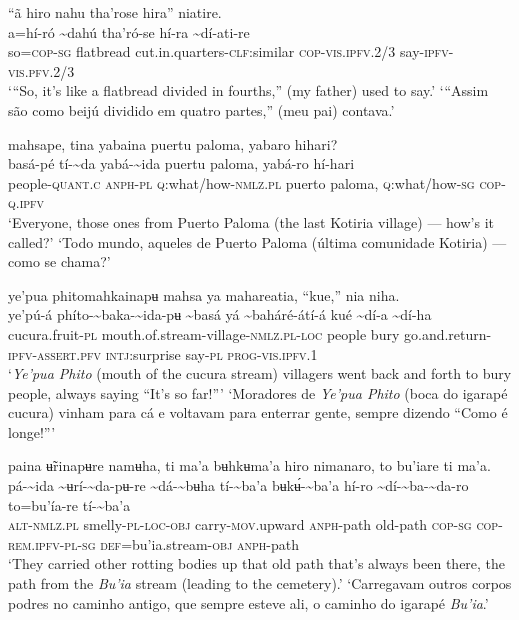\documentclass[output=paper,
modfonts,nonflat
]{langsci/langscibook}
\begin{document}
\ea “ã hiro nahu tha'rose hira” niatire. \\[.3em]
\gll {\textasciitilde}a=hí-ró	{\textasciitilde}dahú	tha'ró-se	hí-ra	{\textasciitilde}dí-ati-re \\
     so=\textsc{cop-sg}	flatbread	cut.in.quarters-\textsc{clf:}similar	\textsc{cop-vis.ipfv.}2/3	say-\textsc{ipfv-vis.pfv.}2/3\\
\glt ‘“So, it's like a flatbread divided in fourths,” (my father) used to say.’
\glt ‘“Assim são como beijú dividido em quatro partes,” (meu pai) contava.’
\z 

\ea mahsape, tina yabaina puertu paloma, yabaro hihari? \\[.3em]
\gll {\textasciitilde}basá-pé	tí-{\textasciitilde}da	yabá-{\textasciitilde}ida	puertu paloma,	yabá-ro	hí-hari \\
     people-\textsc{quant.c}	\textsc{anph-pl}	\textsc{q:}what/how\textsc{-nmlz.pl}	puerto paloma,	\textsc{q:}what/how\textsc{-sg}	\textsc{cop-q.ipfv}\\
\glt ‘Everyone, those ones from Puerto Paloma (the last Kotiria village) — how’s it called?’
\glt ‘Todo mundo, aqueles de Puerto Paloma (última comunidade Kotiria) — como se chama?’
\z 


\ea ye'pua phitomahkainapʉ mahsa ya mahareatia, “kue,” nia niha. \\[.3em]
\gll ye'pú-á	phíto-{\textasciitilde}baka-{\textasciitilde}ida-pʉ	{\textasciitilde}basá	yá	{\textasciitilde}baháré-átí-á kué	{\textasciitilde}dí-a	{\textasciitilde}dí-ha\\
     cucura.fruit\textsc{-pl}	mouth.of.stream-village\textsc{-nmlz.pl-loc}	people	bury	go.and.return-\textsc{ipfv-assert.pfv} \textsc{intj}:surprise	say\textsc{-pl}	\textsc{prog-vis.ipfv.}1\\
\newpage 
\glt ‘\textit{Ye'pua Phito} (mouth of the cucura stream) villagers went back and forth to bury people, always saying “It's so far!”’
\glt ‘Moradores de \textit{Ye'pua Phito} (boca do igarapé cucura) vinham para cá e voltavam para enterrar gente, sempre dizendo “Como é longe!”’
\z

\ea paina ʉ̃rinapʉre namʉha, ti ma'a bʉhkʉma'a hiro nimanaro, to bu'iare ti ma'a. \\[.3em]
\gll pá-{\textasciitilde}ida	{\textasciitilde}ʉrí-{\textasciitilde}da-pʉ-re	{\textasciitilde}dá-{\textasciitilde}bʉha	tí-{\textasciitilde}ba'a	bʉkʉ́-{\textasciitilde}ba'a	hí-ro {\textasciitilde}dí-{\textasciitilde}ba-{\textasciitilde}da-ro	to=bu'ía-re	tí-{\textasciitilde}ba'a \\
     \textsc{alt-nmlz.pl}	smelly\textsc{-pl-loc-obj}	carry-\textsc{mov.}upward	\textsc{anph}-path	old-path	\textsc{cop-sg} \textsc{cop-rem.ipfv-pl-sg}	\textsc{def}=bu'ia.stream\textsc{-obj}	\textsc{anph}-path\\
\glt ‘They carried other rotting bodies up that old path that's always been there, the path from the \textit{Bu'ia} stream (leading to the cemetery).’
\glt ‘Carregavam outros corpos podres no caminho antigo, que sempre esteve ali, o caminho do igarapé \textit{Bu'ia}.’
\z 
\end{document}
